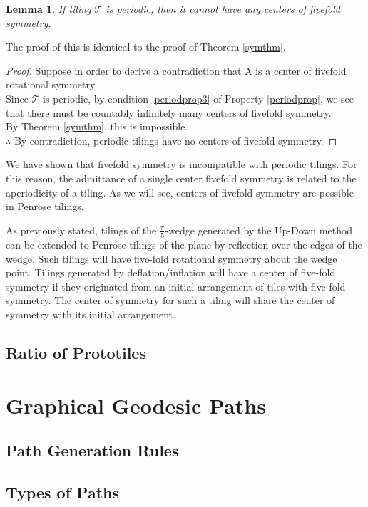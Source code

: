 \documentclass[
  oneside,
  11pt, a4paper,
  footinclude=true,
  headinclude=true,
  cleardoublepage=empty
]{scrbook}
\newtheorem{mylem}{Lemma}
\begin{document}
\begin{mylem}
If tiling $\mathcal{T}$ is periodic, then it cannot have any centers of fivefold symmetry.
\end{mylem}
The proof of this is identical to the proof of Theorem \ref{symthm}.
\begin{proof}
Suppose in order to derive a contradiction that A is a center of fivefold rotational symmetry.\\
Since $\mathcal{T}$ is periodic, by condition \ref{periodprop3} of Property \ref{periodprop}, we see that there must be countably infinitely many centers of fivefold symmetry.\\
By Theorem \ref{symthm}, this is impossible.\\
$\therefore$ By contradiction, periodic tilings have no centers of fivefold symmetry.
\end{proof}

We have shown that fivefold symmetry is incompatible with periodic tilings. For this reason, the admittance of a single center fivefold symmetry is related to the aperiodicity of a tiling. As we will see, centers of fivefold symmetry are possible in Penrose tilings. 

As previously stated, tilings of the $\frac{\pi}{5}$-wedge generated by the Up-Down method can be extended to Penrose tilings of the plane by reflection over the edges of the wedge. Such tilings will have five-fold rotational symmetry about the wedge point. Tilings generated by deflation/inflation will have a center of five-fold symmetry if they originated from an initial arrangement of tiles with five-fold symmetry. The center of symmetry for such a tiling will share the center of symmetry with its initial arrangement.  





\section{Ratio of Prototiles}
\chapter{Graphical Geodesic Paths}
\section{Path Generation Rules}
\section{Types of Paths}


    
\end{document}

